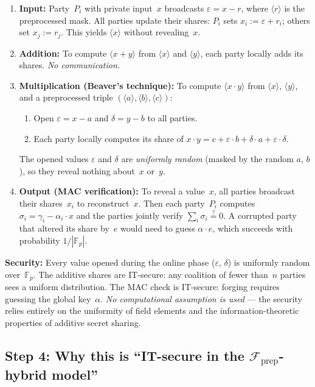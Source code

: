 \documentclass{article}
\begin{document}
\begin{enumerate}
  \item \textbf{Input:} Party~$P_i$ with private input~$x$ broadcasts $\varepsilon = x - r$, where $\langle r \rangle$ is the preprocessed mask. All parties update their shares: $P_i$ sets $x_i := \varepsilon + r_i$; others set $x_j := r_j$. This yields $\langle x \rangle$ without revealing~$x$.
  \item \textbf{Addition:} To compute $\langle x + y \rangle$ from $\langle x \rangle$ and $\langle y \rangle$, each party locally adds its shares. \emph{No communication.}
  \item \textbf{Multiplication (Beaver's technique):} To compute $\langle x \cdot y \rangle$ from $\langle x \rangle$, $\langle y \rangle$, and a preprocessed triple $(\langle a \rangle, \langle b \rangle, \langle c \rangle)$:
  \begin{enumerate}
    \item Open $\varepsilon = x - a$ and $\delta = y - b$ to all parties.
    \item Each party locally computes its share of $x \cdot y = c + \varepsilon \cdot b + \delta \cdot a + \varepsilon \cdot \delta$.
  \end{enumerate}
  The opened values $\varepsilon$ and $\delta$ are \emph{uniformly random} (masked by the random $a$, $b$), so they reveal nothing about~$x$ or~$y$.
  \item \textbf{Output (MAC verification):} To reveal a value~$x$, all parties broadcast their shares~$x_i$ to reconstruct~$x$. Then each party~$P_i$ computes $\sigma_i = \gamma_i - \alpha_i \cdot x$ and the parties jointly verify $\sum_i \sigma_i \stackrel{?}{=} 0$. A corrupted party that altered its share by~$e$ would need to guess $\alpha \cdot e$, which succeeds with probability $1/|\mathbb{F}_p|$.
\end{enumerate}

\noindent\textbf{Security:} Every value opened during the online phase ($\varepsilon$, $\delta$) is uniformly random over~$\mathbb{F}_p$. The additive shares are IT-secure: any coalition of fewer than~$n$ parties sees a uniform distribution. The MAC check is IT-secure: forging requires guessing the global key~$\alpha$. \emph{No computational assumption is used} --- the security relies entirely on the uniformity of field elements and the information-theoretic properties of additive secret sharing.

\subsection*{Step 4: Why this is ``IT-secure in the $\mathcal{F}_{\mathrm{prep}}$-hybrid model''}
\end{document}
